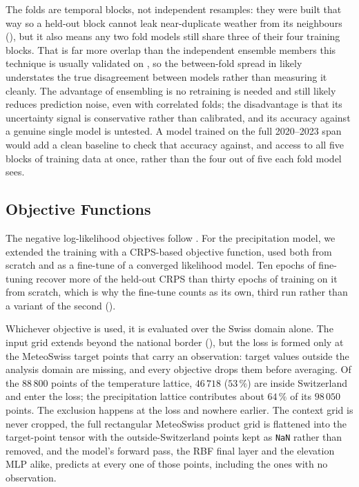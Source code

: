 The folds are temporal blocks, not independent resamples: they were built that way so a held-out block cannot leak near-duplicate weather from its neighbours (), but it also means any two fold models still share three of their four training blocks. That is far more overlap than the independent ensemble members this technique is usually validated on \cite{dutschmann2023kfoldensemble}, so the between-fold spread in  likely understates the true disagreement between models rather than measuring it cleanly. The advantage of ensembling is no retraining is needed and still likely reduces prediction noise, even with correlated folds; the disadvantage is that its uncertainty signal is conservative rather than calibrated, and its accuracy against a genuine single model is untested. A model trained on the full 2020--2023 span would add a clean baseline to check that accuracy against, and access to all five blocks of training data at once, rather than the four out of five each fold model sees.

\subsection{Objective Functions}\label{objective}
The negative log-likelihood objectives follow \textcite{vaughan2022convcnp}. For the precipitation model, we extended the training with a CRPS-based objective function, used both from scratch and as a fine-tune of a converged likelihood model. Ten epochs of fine-tuning recover more of the held-out CRPS than thirty epochs of training on it from scratch, which is why the fine-tune counts as its own, third run rather than a variant of the second ().

Whichever objective is used, it is evaluated over the Swiss domain alone. The input grid extends beyond the national border (), but the loss is formed only at the MeteoSwiss target points that carry an observation: target values outside the analysis domain are missing, and every objective drops them before averaging. Of the $88\,800$ points of the temperature lattice, $46\,718$ ($53\,\%$) are inside Switzerland and enter the loss; the precipitation lattice contributes about $64\,\%$ of its $98\,050$ points. The exclusion happens at the loss and nowhere earlier. The context grid is never cropped, the full rectangular MeteoSwiss product grid is flattened into the target-point tensor with the outside-Switzerland points kept as \texttt{NaN} rather than removed, and the model's forward pass, the RBF final layer and the elevation MLP alike, predicts at every one of those points, including the ones with no observation. 
